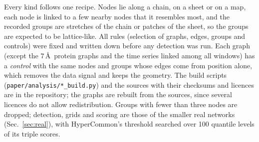 \label{app:reallattice}

Every kind follows one recipe. Nodes lie along a chain, on a sheet or on a map, each
node is linked to a few nearby nodes that it resembles most, and the recorded groups are
stretches of the chain or patches of the sheet, so the groups are expected to be
lattice-like. All rules (selection of graphs, edges, groups and controls) were fixed and
written down before any detection was run. Each graph (except the $7$\,\AA\ protein
graphs and the time series linked among all windows) has a \emph{control} with the same
nodes and groups whose edges come from position alone, which removes the data signal and
keeps the geometry. The build scripts (\texttt{paper/analysis/*\_build.py}) and the
sources with their checksums and licences are in the repository; the graphs are rebuilt
from the sources, since several licences do not allow redistribution. Groups with
fewer than three nodes are dropped; detection, grids and scoring are those of the
smaller real networks (Sec.~\ref{sec:real}), with HyperCommon's threshold searched over
100 quantile levels of its triple scores.

